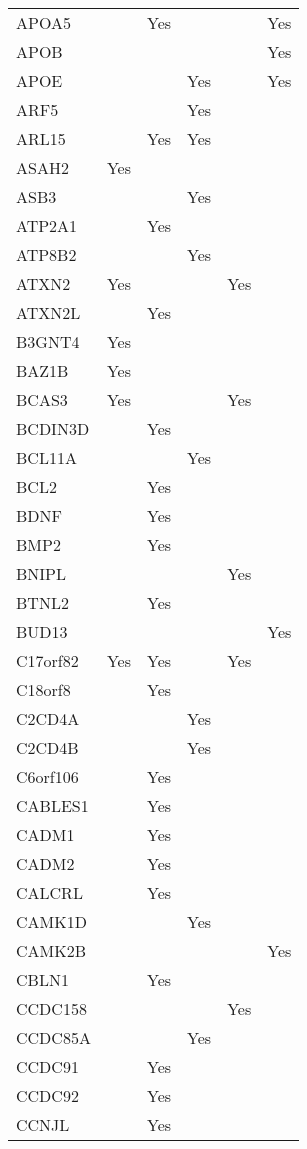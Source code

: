 \documentclass[]{report}
\begin{document}
\begin{longtable}[t]{llllll}
APOA5 &  & Yes &  &  & Yes\\
APOB &  &  &  &  & Yes\\
APOE &  &  & Yes &  & Yes\\
ARF5 &  &  & Yes &  & \\
ARL15 &  & Yes & Yes &  & \\
ASAH2 & Yes &  &  &  & \\
ASB3 &  &  & Yes &  & \\
ATP2A1 &  & Yes &  &  & \\
ATP8B2 &  &  & Yes &  & \\
ATXN2 & Yes &  &  & Yes & \\
ATXN2L &  & Yes &  &  & \\
B3GNT4 & Yes &  &  &  & \\
BAZ1B & Yes &  &  &  & \\
BCAS3 & Yes &  &  & Yes & \\
BCDIN3D &  & Yes &  &  & \\
BCL11A &  &  & Yes &  & \\
BCL2 &  & Yes &  &  & \\
BDNF &  & Yes &  &  & \\
BMP2 &  & Yes &  &  & \\
BNIPL &  &  &  & Yes & \\
BTNL2 &  & Yes &  &  & \\
BUD13 &  &  &  &  & Yes\\
C17orf82 & Yes & Yes &  & Yes & \\
C18orf8 &  & Yes &  &  & \\
C2CD4A &  &  & Yes &  & \\
C2CD4B &  &  & Yes &  & \\
C6orf106 &  & Yes &  &  & \\
CABLES1 &  & Yes &  &  & \\
CADM1 &  & Yes &  &  & \\
CADM2 &  & Yes &  &  & \\
CALCRL &  & Yes &  &  & \\
CAMK1D &  &  & Yes &  & \\
CAMK2B &  &  &  &  & Yes\\
CBLN1 &  & Yes &  &  & \\
CCDC158 &  &  &  & Yes & \\
CCDC85A &  &  & Yes &  & \\
CCDC91 &  & Yes &  &  & \\
CCDC92 &  & Yes &  &  & \\
CCNJL &  & Yes &  &  & \\

\end{longtable}
\end{document}
